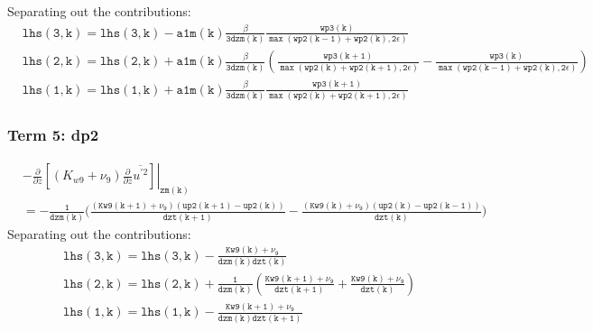 \documentclass[11pt,fleqn]{article}
\newcommand{\ptlder}[2]{\frac{\partial #1}{\partial #2}}
\begin{document}
%
Separating out the contributions:
%
\begin{equation}
\begin{split}
& \mathtt{ 
   lhs(3,k) = lhs(3,k) - a1m(k)\frac{\beta}{3 dzm(k)}
                         \frac{wp3(k)}
                              {\max\left(wp2(k-1)+wp2(k),2\epsilon\right)}
  } \\
& \mathtt{
   lhs(2,k) = lhs(2,k) + a1m(k)\frac{\beta}{3 dzm(k)}
                         \left(
                           \frac{wp3(k+1)}
                                {\max\left(wp2(k)+wp2(k+1),2\epsilon\right)}
                          -\frac{wp3(k)}
                                {\max\left(wp2(k-1)+wp2(k),2\epsilon\right)}
                         \right)
  } \\
& \mathtt{
   lhs(1,k) = lhs(1,k) + a1m(k)\frac{\beta}{3 dzm(k)}
                         \frac{wp3(k+1)}
                              {\max\left(wp2(k)+wp2(k+1),2\epsilon\right)}
  }
\end{split}
\end{equation}

\subsubsection{Term 5:  dp2}
%
\begin{equation}
\begin{split}
& \left. - \ptlder{}{z} \left[ \left( K_{w9} + \nu_9 \right)
                               \ptlder{}{z} \overline{u^{'2}}
                        \right] \right|_{\mathtt{zm(k)}}  \\
 &= \mathtt{
    -\frac{1}{dzm(k)}
     \bigg( \frac{ \left( Kw9(k+1) + \nu_9 \right)
                   \left( up2(k+1) - up2(k) \right)} {dzt(k+1)}
           -\frac{ \left( Kw9(k) + \nu_9 \right)
                   \left( up2(k) - up2(k-1) \right)} {dzt(k)}
     \bigg)
    }
\end{split}
\end{equation}
%
Separating out the contributions:
%
\begin{equation}
\begin{split}
&\mathtt{lhs(3,k) = lhs(3,k) - \frac{Kw9(k)+\nu_9}{dzm(k)dzt(k)} } \\
&\mathtt{lhs(2,k) = lhs(2,k) + \frac{1}{dzm(k)}
                               \left(   \frac{Kw9(k+1)+\nu_9}{dzt(k+1)}
                                      + \frac{Kw9(k)+\nu_9}{dzt(k)} \right) } \\
&\mathtt{lhs(1,k) = lhs(1,k) - \frac{Kw9(k+1)+\nu_9}{dzm(k)dzt(k+1)} }
\end{split}
\end{equation}
%
\end{document}
